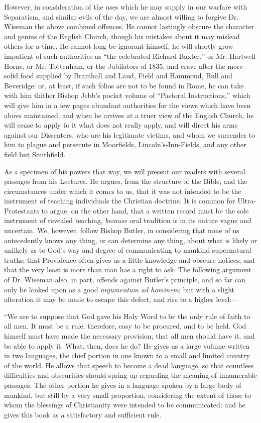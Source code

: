 However, in
consideration of the uses which he may supply in our warfare with
Separatism, and similar evils of the day, we are almost willing to
forgive Dr. Wiseman the above combined offences. He cannot lastingly
obscure the character and genius of the English Church, though his
mistakes about it may mislead others for a time. He cannot long be
ignorant himself; he will shortly grow impatient of such authorities as ``the celebrated Richard Baxter,'' or Mr. Hartwell Horne, or Mr.
Tottenham, or the Jubilators of 1835, and crave after the more solid
food supplied by Bramhall and Laud, Field and Hammond, Bull and
Beveridge: or, at least, if such folios are not to be found in Rome, he
can take with him thither Bishop Jebb's pocket volume of ``Pastoral
Instructions,'' which will give him in a few pages abundant authorities
for the views which have been above maintained; and when he arrives at a
truer view of the English Church, he will cease to apply to it what does
not really apply, and will direct his arms against our Dissenters, who
are his legitimate victims, and whom we surrender to him to plague and
persecute in Moorfields, Lincoln's-Inn-Fields, and any other field but
Smithfield.

As a
specimen of his powers that way, we will present our readers with
several passages from his Lectures. He argues, from the structure of the
Bible, and the circumstances under which it comes to us, that it was not
intended to be the instrument of teaching individuals the Christian
doctrine. It is common for Ultra-Protestants to argue, on the other
hand, that a written record must be the sole instrument of revealed
teaching, \emph{because} oral tradition is in its nature vague and
uncertain. We, however, follow Bishop Butler, in considering that none
of us antecedently knows any thing, or can determine any thing, about
what is likely or unlikely as to God's way and degree of communicating
to mankind supernatural truths; that Providence often gives us a little
knowledge and obscure notices; and that the very least is more than man
has a right to ask. The following argument of Dr. Wiseman also, in part,
offends against Butler's principle, and so far can only be looked upon
as a good \emph{argumentum ad hominem}; but with a slight alteration it
may be made to escape this defect, and rise to a higher level:—

``We
are to suppose that God gave his Holy Word to be the only rule of faith
to all men. It must be a rule, therefore, easy to be procured, and to be
held. God himself must have made the necessary provision, that all men
should have it, and be able to apply it. What, then, does he do? He
gives us a large volume written in two languages, the chief portion in
one known to a small and limited country of the world. He allows
that speech to become a dead language, so that countless difficulties
and obscurities should spring up regarding the meaning of innumerable
passages. The other portion he gives in a language spoken by a large
body of mankind, but still by a very small proportion, considering the
extent of those to whom the blessings of Christianity were intended to
be communicated; and he gives this book as a satisfactory and sufficient
rule.

